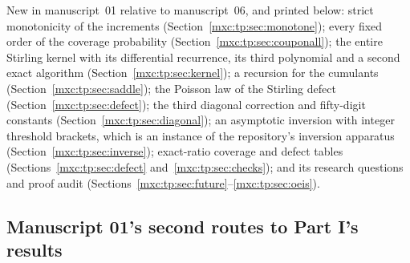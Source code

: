 \documentclass[11pt]{article}
\numberwithin{equation}{section}
\theoremstyle{definition}
\theoremstyle{remark}
\begin{document}
New in manuscript~01 relative to manuscript~06, and printed below: strict
monotonicity of the increments (Section~\ref{mxc:tp:sec:monotone}); every
fixed order of the coverage probability
(Section~\ref{mxc:tp:sec:couponall}); the entire Stirling kernel with its
differential recurrence, its third polynomial and a second exact
algorithm (Section~\ref{mxc:tp:sec:kernel}); a recursion for the
cumulants (Section~\ref{mxc:tp:sec:saddle}); the Poisson law of the
Stirling defect (Section~\ref{mxc:tp:sec:defect}); the third diagonal
correction and fifty-digit constants (Section~\ref{mxc:tp:sec:diagonal});
an asymptotic inversion with integer threshold brackets, which is an
instance of the repository's inversion apparatus
(Section~\ref{mxc:tp:sec:inverse}); exact-ratio coverage and defect tables
(Sections~\ref{mxc:tp:sec:defect} and~\ref{mxc:tp:sec:checks}); and its
research questions and proof audit
(Sections~\ref{mxc:tp:sec:future}--\ref{mxc:tp:sec:oeis}).

\subsection{Manuscript 01's second routes to Part I's results}
\end{document}

